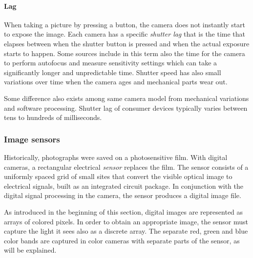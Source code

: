 


\paragraph{Lag}
When taking a picture by pressing a button, the camera does not instantly start to expose the image.
Each camera has a specific \emph{shutter lag} that is the time that elapses between when the shutter button is pressed and when the actual exposure starts to happen.
Some sources include in this term also the time for the camera to perform autofocus and measure sensitivity settings which can take a significantly longer and unpredictable time.
Shutter speed has also small variations over time when the camera ages and mechanical parts wear out.

Some difference also exists among same camera model from mechanical variations and software processing.
Shutter lag of consumer devices typically varies between tens to hundreds of milliseconds.
\cite{hasshutterlag}

\subsubsection{Image sensors} \label{sec:sensors} %


Historically, photographs were saved on a photosensitive film.
With digital cameras, a rectangular electrical \emph{sensor} replaces the film.
The sensor consists of a uniformly spaced grid of small sites that convert the visible optical image to electrical signals, built as an integrated circuit package.
In conjunction with the digital signal processing in the camera, the sensor produces a digital image file.


As introduced in the beginning of this section, digital images are represented as arrays of colored pixels.
In order to obtain an appropriate image, the sensor must capture the light it sees also as a discrete array.
The separate red, green and blue color bands are captured in color cameras with separate parts of the sensor, as will be explained.


